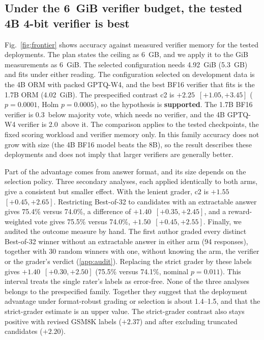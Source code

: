 \subsection{Under the 6~GiB verifier budget, the tested 4B 4-bit verifier is best}\label{sec:frontier}

Fig.~\ref{fig:frontier} shows accuracy against measured verifier memory for the tested
deployments. The plan states the ceiling as 6~GB, and we apply it to the GiB
measurements as 6~GiB. The selected configuration needs 4.92~GiB (5.3~GB) and fits under
either reading. The configuration selected on development data is the 4B ORM with packed
GPTQ-W4, and the best BF16 verifier that fits is the 1.7B ORM (4.02~GiB). The
prespecified contrast c2 is $+2.25$\pp\ $[+1.05, +3.45]$ ($p=0.0001$, Holm $p=0.0005$),
so the hypothesis is \textbf{supported}. The 1.7B BF16 verifier is 0.3\pp\ below
majority vote, which needs no verifier, and the 4B GPTQ-W4 verifier is 2.0\pp\ above
it. The comparison applies to the tested checkpoints, the fixed scoring workload and
verifier memory only. In this family accuracy does not grow with size (the 4B BF16
model beats the 8B), so the result describes these deployments and does not imply that
larger verifiers are generally better.

Part of the advantage comes from answer format, and its size depends on the selection
policy. Three secondary analyses, each applied identically to both arms, give a
consistent but smaller effect. With the lenient grader, c2 is $+1.55$\pp\ $[+0.45,
+2.65]$. Restricting Best-of-32 to candidates with an extractable answer gives 75.4\%
versus 74.0\%, a difference of $+1.40$\pp\ $[+0.35, +2.45]$, and a reward-weighted vote
gives 75.5\% versus 74.0\%, $+1.50$\pp\ $[+0.45, +2.55]$. Finally, we audited the outcome measure by hand. The first author graded every distinct
Best-of-32 winner without an extractable answer in either arm (94 responses), together
with 30 random winners with one, without knowing the arm, the verifier or the grader's
verdict (\ref{app:audit}). Replacing the strict grader by these
labels gives $+1.40$\pp\ $[+0.30, +2.50]$ (75.5\% versus 74.1\%, nominal $p=0.011$).
This interval treats the single rater's labels as error-free. None of the three analyses
belongs to the prespecified family. Together they suggest that the deployment advantage
under format-robust grading or selection is about 1.4--1.5\pp, and that the
strict-grader estimate is an upper value. The strict-grader contrast also stays
positive with revised GSM8K labels ($+2.37$\pp) and after excluding truncated
candidates ($+2.20$\pp).

